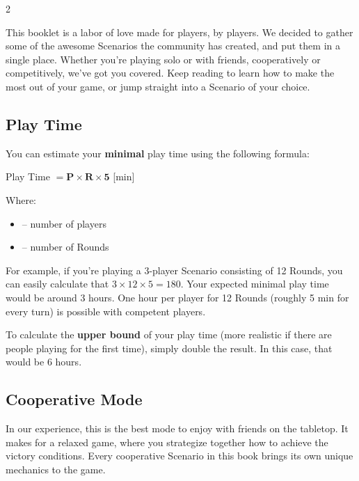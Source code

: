 
\begin{multicols*}{2}

This booklet is a labor of love made for players, by players.
We decided to gather some of the awesome Scenarios the community has created, and put them in a single place.
Whether you're playing solo or with friends, cooperatively or competitively, we've got you covered.
Keep reading to learn how to make the most out of your game, or jump straight into a Scenario of your choice.

\subsection*{Play Time}

You can estimate your \textbf{minimal} play time using the following formula:

\begin{center}
  Play Time $= \boldsymbol{P × R × 5}$ [min]
\end{center}

Where:
\begin{itemize}
  \item[$\textbf{P}$] -- number of players
  \item[$\textbf{R}$] -- number of Rounds
\end{itemize}

For example, if you're playing a 3-player Scenario consisting of 12 Rounds, you can easily calculate that $3 \times 12 \times 5 = 180$.
Your expected minimal play time would be around 3 hours.
One hour per player for 12 Rounds (roughly 5 min for every turn) is possible with competent players.

To calculate the \textbf{upper bound} of your play time (more realistic if there are people playing for the first time), simply double the result.
In this case, that would be 6 hours.

\subsection*{Cooperative Mode}

In our experience, this is the best mode to enjoy with friends on the tabletop.
It makes for a relaxed game, where you strategize together how to achieve the victory conditions.
Every cooperative Scenario in this book brings its own unique mechanics to the game.
\columnbreak


\end{multicols*}

